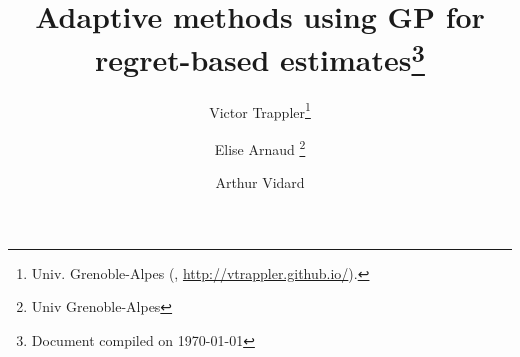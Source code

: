 

\usepackage{lipsum}
\usepackage{amsfonts}
\usepackage{graphicx}
\usepackage{epstopdf}
\usepackage{algorithmic}
\usepackage[T1]{fontenc}
\usepackage[utf8]{inputenc}
\ifpdf
\else
\fi

\newcommand{\creflastconjunction}{, and~}



\title{Adaptive methods using GP for regret-based estimates\thanks{Document compiled on \today }%
}

\author{Victor Trappler\thanks{Univ. Grenoble-Alpes  (, \url{http://vtrappler.github.io/}).}
\and Elise Arnaud \thanks{Univ Grenoble-Alpes} \and Arthur Vidard\footnotemark[3]}

\usepackage{amsopn}
\DeclareMathOperator{\diag}{diag}
\newcommand{\kk}{\theta}
\newcommand{\uu}{u}
\newcommand{\KK}{\theta}
\newcommand{\UU}{U}
\newcommand{\Kspace}{\Theta}
\newcommand{\Uspace}{\mathbb{U}}
\newcommand{\Xspace}{\mathbb{X}}

